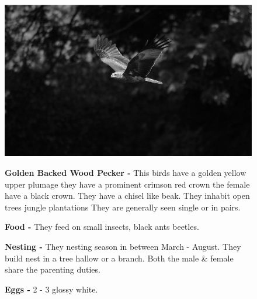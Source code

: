\begin{figure}[H]
\begin{center}
\includegraphics{figure/Land_birds/01_pariah_kite/pariah-kite.eps}
\end{center}
\medskip
\noindent
{\bf Golden Backed Wood Pecker -} This birds have a golden yellow upper plumage they have a prominent crimson red crown the female have a black crown. They have a chisel like beak. They inhabit open trees jungle plantations They are generally seen single or in pairs.

\medskip
{\bf Food -} They feed on small insects, black ants beetles.

{\bf Nesting -} They nesting season in between March - August. They build nest in a tree hallow or a branch. Both the male \& female share the parenting duties.

{\bf Eggs -} 2 - 3 glossy white.
\end{figure}

\vfill\eject

~\phantom{a}
\vfill

